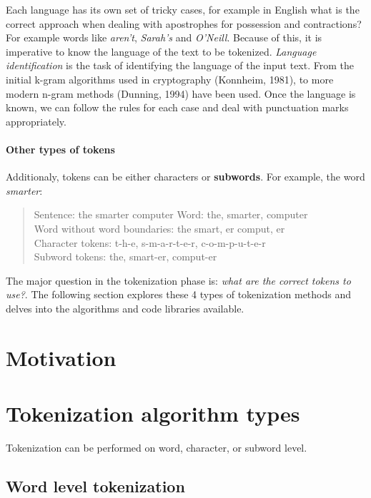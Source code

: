 Each language has its own set of tricky cases, for example in English what is the correct approach when dealing with apostrophes for possession and contractions? For example words like \emph{aren't}, \emph{Sarah's} and \emph{O'Neill}. Because of this, it is imperative to know the language of the text to be tokenized. \textit{Language identification} is the task of identifying the language of the input text. From the initial k-gram algorithms used in cryptography (Konnheim, 1981), to more modern n-gram methods (Dunning, 1994) have been used. Once the language is known, we can follow the rules for each case and deal with punctuation marks appropriately.

\paragraph{Other types of tokens}

Additionaly, tokens can be either characters or \textbf{subwords}. For example, the word \emph{smarter}:

\begin{quote}
    Sentence: the smarter computer
    Word: the, smarter, computer\\
    Word without word boundaries: the smart, er comput, er\\
    Character tokens: t-h-e, s-m-a-r-t-e-r, c-o-m-p-u-t-e-r\\
    Subword tokens: the, smart-er, comput-er
\end{quote}

The major question in the tokenization phase is: \textit{what are the correct tokens to use?}. The following section explores these 4 types of tokenization methods and delves into the algorithms and code libraries available.


\section{Motivation}



\section{Tokenization algorithm types}

Tokenization can be performed on word, character, or subword level.

\subsection{Word level tokenization}

